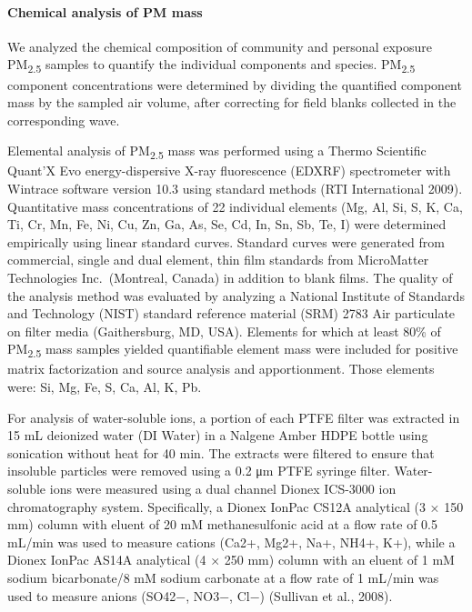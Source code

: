\documentclass[
  letterpaper,
  DIV=11,
  numbers=noendperiod]{scrartcl}
\let\oldparagraph\paragraph
\renewcommand{\paragraph}[1]{\oldparagraph{#1}\mbox{}}
\begin{document}
\hypertarget{chemical-analysis-of-pm-mass}{%
\paragraph{Chemical analysis of PM
mass}\label{chemical-analysis-of-pm-mass}}

We analyzed the chemical composition of community and personal exposure
PM\textsubscript{2.5} samples to quantify the individual components and
species. PM\textsubscript{2.5} component concentrations were determined
by dividing the quantified component mass by the sampled air volume,
after correcting for field blanks collected in the corresponding wave.

Elemental analysis of PM\textsubscript{2.5} mass was performed using a
Thermo Scientific Quant'X Evo energy-dispersive X-ray fluorescence
(EDXRF) spectrometer with Wintrace software version 10.3 using standard
methods (RTI International 2009). Quantitative mass concentrations of 22
individual elements (Mg, Al, Si, S, K, Ca, Ti, Cr, Mn, Fe, Ni, Cu, Zn,
Ga, As, Se, Cd, In, Sn, Sb, Te, I) were determined empirically using
linear standard curves. Standard curves were generated from commercial,
single and dual element, thin film standards from MicroMatter
Technologies Inc.~(Montreal, Canada) in addition to blank films. The
quality of the analysis method was evaluated by analyzing a National
Institute of Standards and Technology (NIST) standard reference material
(SRM) 2783 Air particulate on filter media (Gaithersburg, MD, USA).
Elements for which at least 80\% of PM\textsubscript{2.5} mass samples
yielded quantifiable element mass were included for positive matrix
factorization and source analysis and apportionment. Those elements
were: Si, Mg, Fe, S, Ca, Al, K, Pb.

For analysis of water-soluble ions, a portion of each PTFE filter was
extracted in 15 mL deionized water (DI Water) in a Nalgene Amber HDPE
bottle using sonication without heat for 40 min. The extracts were
filtered to ensure that insoluble particles were removed using a 0.2 μm
PTFE syringe filter. Water-soluble ions were measured using a dual
channel Dionex ICS-3000 ion chromatography system. Specifically, a
Dionex IonPac CS12A analytical (3 × 150 mm) column with eluent of 20 mM
methanesulfonic acid at a flow rate of 0.5 mL/min was used to measure
cations (Ca2+, Mg2+, Na+, NH4+, K+), while a Dionex IonPac AS14A
analytical (4 × 250 mm) column with an eluent of 1 mM sodium
bicarbonate/8 mM sodium carbonate at a flow rate of 1 mL/min was used to
measure anions (SO42−, NO3−, Cl−) (Sullivan et al., 2008).
\end{document}
